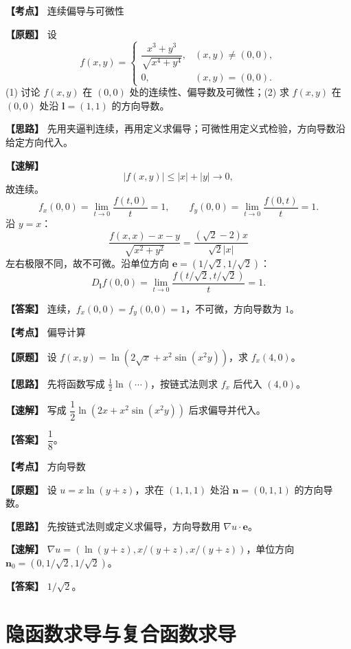 ﻿\documentclass[11pt,a4paper,UTF8]{ctexart}
\begin{document}
\begin{answerbox}[2022--2023 三-10]
\textbf{【考点】} 连续偏导与可微性

\textbf{【原题】} 设
\[
f(x,y)=
\begin{cases}
\dfrac{x^3+y^3}{\sqrt{x^4+y^4}},&(x,y)\ne(0,0),\\[4pt]
0,&(x,y)=(0,0).
\end{cases}
\]
(1) 讨论 $f(x,y)$ 在 $(0,0)$ 处的连续性、偏导数及可微性；(2) 求 $f(x,y)$ 在 $(0,0)$ 处沿 $\boldsymbol l=(1,1)$ 的方向导数。

\textbf{【思路】} 先用夹逼判连续，再用定义求偏导；可微性用定义式检验，方向导数沿给定方向代入。

\textbf{【速解】}
\[
|f(x,y)|\le |x|+|y|\to0,
\]
故连续。
\[
f_x(0,0)=\lim_{t\to0}\frac{f(t,0)}t=1,\qquad
f_y(0,0)=\lim_{t\to0}\frac{f(0,t)}t=1.
\]
沿 $y=x$：
\[
\frac{f(x,x)-x-y}{\sqrt{x^2+y^2}}
=\frac{(\sqrt2-2)x}{\sqrt2|x|}
\]
左右极限不同，故不可微。沿单位方向
$\boldsymbol e=(1/\sqrt2,1/\sqrt2)$：
\[
D_{\boldsymbol l}f(0,0)
=\lim_{t\to0}\frac{f(t/\sqrt2,t/\sqrt2)}t=1.
\]

\textbf{【答案】} 连续，$f_x(0,0)=f_y(0,0)=1$，不可微，方向导数为 $1$。
\end{answerbox}

\begin{answerbox}[2022--2023 一-3]
\textbf{【考点】} 偏导计算

\textbf{【原题】} 设 $f(x,y)=\ln\!\left(2\sqrt{x}+x^2\sin(x^2y)\right)$，求 $f_x(4,0)$。

\textbf{【思路】} 先将函数写成 $\frac12\ln(\cdots)$，按链式法则求 $f_x$ 后代入 $(4,0)$。

\textbf{【速解】} 写成 $\dfrac12\ln(2x+x^2\sin(x^2y))$ 后求偏导并代入。

\textbf{【答案】} $\dfrac18$。
\end{answerbox}

\begin{answerbox}[2021--2022 一-5]
\textbf{【考点】} 方向导数

\textbf{【原题】} 设 $u=x\ln(y+z)$，求在 $(1,1,1)$ 处沿 $\boldsymbol n=(0,1,1)$ 的方向导数。

\textbf{【思路】} 先按链式法则或定义求偏导，方向导数用 $\nabla u\cdot\boldsymbol e$。

\textbf{【速解】} $\nabla u=(\ln(y+z),x/(y+z),x/(y+z))$，单位方向 $\boldsymbol n_0=(0,1/\sqrt2,1/\sqrt2)$。

\textbf{【答案】} $1/\sqrt2$。
\end{answerbox}
\section{隐函数求导与复合函数求导}
\end{document}
